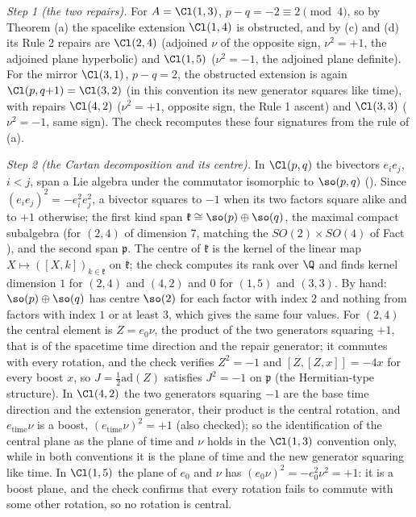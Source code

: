 \emph{Step 1 (the two repairs).} For $A = \Cl(1,3)$, $p - q = -2 \equiv 2 \pmod 4$, so by Theorem (a) the spacelike extension $\Cl(1,4)$ is obstructed, and by (c) and (d) its Rule 2 repairs are $\Cl(2,4)$ (adjoined $\nu$ of the opposite sign, $\nu^{2} = +1$, the adjoined plane hyperbolic) and $\Cl(1,5)$ ($\nu^{2} = -1$, the adjoined plane definite). For the mirror $\Cl(3,1)$, $p - q = 2$, the obstructed extension is again $\Cl(p,q{+}1) = \Cl(3,2)$ (in this convention its new generator squares like time), with repairs $\Cl(4,2)$ ($\nu^{2} = +1$, opposite sign, the Rule 1 ascent) and $\Cl(3,3)$ ($\nu^{2} = -1$, same sign). The check recomputes these four signatures from the rule of (a).

\emph{Step 2 (the Cartan decomposition and its centre).} In $\Cl(p,q)$ the bivectors $e_{i}e_{j}$, $i < j$, span a Lie algebra under the commutator isomorphic to $\so(p,q)$ (). Since $(e_{i}e_{j})^{2} = -e_{i}^{2}e_{j}^{2}$, a bivector squares to $-1$ when its two factors square alike and to $+1$ otherwise; the first kind span $\mathfrak{k} \cong \so(p) \oplus \so(q)$, the maximal compact subalgebra (for $(2,4)$ of dimension $7$, matching the $SO(2) \times SO(4)$ of Fact ), and the second span $\mathfrak{p}$. The centre of $\mathfrak{k}$ is the kernel of the linear map $X \mapsto ([X, k])_{k \in \mathfrak{k}}$ on $\mathfrak{k}$; the check computes its rank over $\Q$ and finds kernel dimension $1$ for $(2,4)$ and $(4,2)$ and $0$ for $(1,5)$ and $(3,3)$. By hand: $\so(p) \oplus \so(q)$ has centre $\so(2)$ for each factor with index $2$ and nothing from factors with index $1$ or at least $3$, which gives the same four values. For $(2,4)$ the central element is $Z = e_{0}\nu$, the product of the two generators squaring $+1$, that is of the spacetime time direction and the repair generator; it commutes with every rotation, and the check verifies $Z^{2} = -1$ and $[Z,[Z,x]] = -4x$ for every boost $x$, so $J = \tfrac12\mathrm{ad}(Z)$ satisfies $J^{2} = -1$ on $\mathfrak{p}$ (the Hermitian-type structure). In $\Cl(4,2)$ the two generators squaring $-1$ are the base time direction and the extension generator, their product is the central rotation, and $e_{\mathrm{time}}\nu$ is a boost, $(e_{\mathrm{time}}\nu)^{2} = +1$ (also checked); so the identification of the central plane as the plane of time and $\nu$ holds in the $\Cl(1,3)$ convention only, while in both conventions it is the plane of time and the new generator squaring like time. In $\Cl(1,5)$ the plane of $e_{0}$ and $\nu$ has $(e_{0}\nu)^{2} = -e_{0}^{2}\nu^{2} = +1$: it is a boost plane, and the check confirms that every rotation fails to commute with some other rotation, so no rotation is central.

